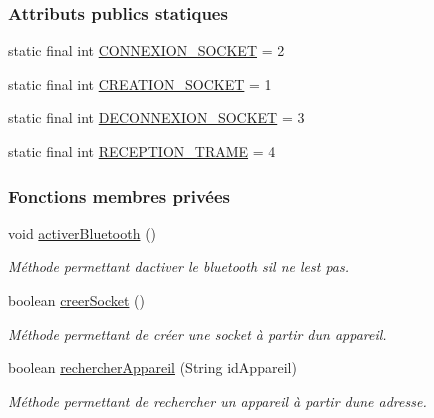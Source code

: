 \subsubsection*{Attributs publics statiques}
\begin{DoxyCompactItemize}
\item 
static final int \hyperlink{classcom_1_1example_1_1area_1_1_liaison_bluetooth_a4870b4fac5c0f1aedac1bb40346d43da}{C\+O\+N\+N\+E\+X\+I\+O\+N\+\_\+\+S\+O\+C\+K\+ET} = 2
\item 
static final int \hyperlink{classcom_1_1example_1_1area_1_1_liaison_bluetooth_ac961c73879bd0de9933b2fc310cc5e7e}{C\+R\+E\+A\+T\+I\+O\+N\+\_\+\+S\+O\+C\+K\+ET} = 1
\item 
static final int \hyperlink{classcom_1_1example_1_1area_1_1_liaison_bluetooth_a8ff08468d7b2cead9c3714c665f75d0e}{D\+E\+C\+O\+N\+N\+E\+X\+I\+O\+N\+\_\+\+S\+O\+C\+K\+ET} = 3
\item 
static final int \hyperlink{classcom_1_1example_1_1area_1_1_liaison_bluetooth_a1a3058c683cec15fe0f3699f7fc26073}{R\+E\+C\+E\+P\+T\+I\+O\+N\+\_\+\+T\+R\+A\+ME} = 4
\end{DoxyCompactItemize}
\subsubsection*{Fonctions membres privées}
\begin{DoxyCompactItemize}
\item 
void \hyperlink{classcom_1_1example_1_1area_1_1_liaison_bluetooth_acc6b0431535ca4d7abc65e84deff8002}{activer\+Bluetooth} ()
\begin{DoxyCompactList}\small\item\em Méthode permettant d\textquotesingle{}activer le bluetooth s\textquotesingle{}il ne l\textquotesingle{}est pas. \end{DoxyCompactList}\item 
boolean \hyperlink{classcom_1_1example_1_1area_1_1_liaison_bluetooth_a69ea46dca5a0690d5d8231731ae60d9f}{creer\+Socket} ()
\begin{DoxyCompactList}\small\item\em Méthode permettant de créer une socket à partir d\textquotesingle{}un appareil. \end{DoxyCompactList}\item 
boolean \hyperlink{classcom_1_1example_1_1area_1_1_liaison_bluetooth_a47786b43e054a81e08356cd22b4cb37e}{rechercher\+Appareil} (String id\+Appareil)
\begin{DoxyCompactList}\small\item\em Méthode permettant de rechercher un appareil à partir d\textquotesingle{}une adresse. \end{DoxyCompactList}\end{DoxyCompactItemize}
